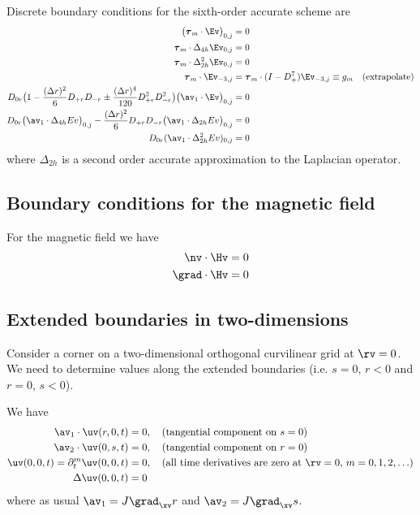 Discrete boundary conditions for the sixth-order accurate scheme are
\begin{align*}
    \big(\tauv_m\cdot\Ev\big)_{0,j}  &=0  \\
 \tauv_m\cdot\Delta_{4h} \Ev_{0,j}  &=0  \\
 \tauv_m\cdot\Delta_{2h}^2 \Ev_{0,j}  &=0  \\
  \tauv_m\cdot\Ev_{-3,j} &= \tauv_m \cdot (I-D_+^7)\Ev_{-3,j} \equiv g_m   \quad\mbox{(extrapolate)}\\
  D_{0r}\big(1- {(\Delta r)^2\over 6} D_{+r}D_{-r}  
                  \pm {(\Delta r)^4\over 120} D_{+r}^2D_{-r}^2 \big)
                          \big(\av_1\cdot\Ev\big)_{0,j} &= 0 \\
  D_{0r}\big(\av_1\cdot \Delta_{4h}Ev \big)_{0,j}
    -{(\Delta r)^2\over 6} D_{+r}D_{-r}\big( \av_1\cdot \Delta_{2h}Ev\big)_{0,j} &= 0 \\
  D_{0r} (\av_1\cdot \Delta_{2h}^2 Ev )_{0,j} &= 0 
\end{align*}
where $\Delta_{2h}$ is a second order accurate approximation to the Laplacian operator.

\subsection{Boundary conditions for the magnetic field}
For the magnetic field we have
\begin{align*}
  \nv\cdot\Hv &= 0 \\
  \grad\cdot\Hv &=0 \\
\end{align*}

\clearpage
\subsection{Extended boundaries in two-dimensions}

Consider a corner on a two-dimensional orthogonal curvilinear grid at $\rv=0$.
We need to determine values along the extended boundaries (i.e. $s=0$, $r<0$ and $r=0$, $s<0$).


We have
\begin{align*}
  \av_1\cdot\uv(r,0,t) &= 0,  \quad\mbox{(tangential component on $s=0$)}\\
  \av_2\cdot\uv(0,s,t) &= 0,  \quad\mbox{(tangential component on $r=0$)}\\
  \uv(0,0,t)=\partial_t^m\uv(0,0,t) &= 0, \quad\mbox{(all time derivatives are zero at $\rv=0$, $m=0,1,2,\ldots$)} \\
  \Delta\uv(0,0,t) & =0
\end{align*}
where as usual $\av_1=J \grad_\xv r$ and $\av_2=J \grad_\xv s$.

